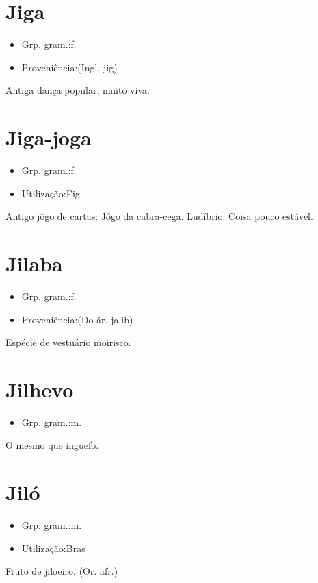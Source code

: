 \documentclass{article}
\begin{document}
\section{Jiga}
\begin{itemize}
\item {Grp. gram.:f.}
\end{itemize}
\begin{itemize}
\item {Proveniência:(Ingl. \textunderscore jig\textunderscore )}
\end{itemize}
Antiga dança popular, muito viva.
\section{Jiga-joga}
\begin{itemize}
\item {Grp. gram.:f.}
\end{itemize}
\begin{itemize}
\item {Utilização:Fig.}
\end{itemize}
Antigo jôgo de cartas: Jôgo da cabra-cega.
Ludíbrio.
Coisa pouco estável.
\section{Jilaba}
\begin{itemize}
\item {Grp. gram.:f.}
\end{itemize}
\begin{itemize}
\item {Proveniência:(Do ár. \textunderscore jalib\textunderscore )}
\end{itemize}
Espécie de vestuário moirisco.
\section{Jilhevo}
\begin{itemize}
\item {Grp. gram.:m.}
\end{itemize}
O mesmo que \textunderscore inguefo\textunderscore .
\section{Jiló}
\begin{itemize}
\item {Grp. gram.:m.}
\end{itemize}
\begin{itemize}
\item {Utilização:Bras}
\end{itemize}
Fruto de jiloeiro.
(Or. afr.)
\end{document}
